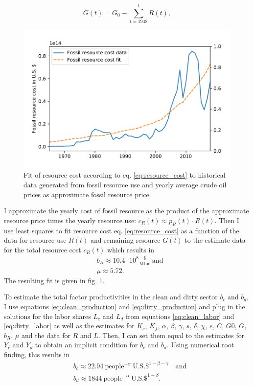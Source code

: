 \begin{equation} 
  G(t) = G_0 - \sum_{t=1948}^{t}R(t),
  \label{eq:fossil_resource_time_series}
\end{equation}
\begin{figure}
	\vspace{-.4 cm}
        \hspace{-1.25 cm}
        \includegraphics[width = .67 \textwidth]{./figures/resource_price_fit.pdf}
        \caption{Fit of resource cost according to eq. \ref{eq:resource_cost} to historical data generated from fossil resource use and yearly average crude oil prices as approximate fossil resource price. \label{fig:resource_cost_fit}}
\end{figure}


I approximate the yearly cost of fossil resource as the product of the approximate resource price times the yearly resource use: $c_R(t) \approx p_R(t) \cdot R(t)$. Then I use least squares to fit resource cost eq. \ref{eq:resource_cost} as a function of the data for resource use $R(t)$ and remaining resource $G(t)$ to the estimate data for the total resource cost $c_R(t)$ which results in 
\begin{align}
  &b_R \approx 10.4 \cdot 10^{8} \frac{\$}{\mathrm{Mtoe}} ~ \mathrm{and}\\
  & \mu \approx 5.72.
  \label{eq:estimate_resource_cost}
\end{align}
The resulting fit is given in fig. \ref{fig:resource_cost_fit}.

To estimate the total factor productivities in the clean and dirty sector $b_c$ and $b_d$, I use equations \ref{eq:clean_production} and \ref{eq:dirty_production} and plug in the solutions for the labor shares $L_c$ and $L_d$ from equations \ref{eq:clean_labor} and \ref{eq:dirty_labor} as well as the estimates for $K_c$, $K_f$, $\alpha$, $\beta$, $\gamma$, $s$, $\delta$, $\chi$, $e$, $C$, $G0$, $G$, $b_R$, $\mu$ and the data for $R$ and $L$. Then, I can set them equal to the estimates for $Y_c$ and $Y_d$ to obtain an implicit condition for $b_c$ and $b_d$. Using numerical root finding, this results in 
 \begin{align}
  &b_c \approx 22.94 ~ \mathrm{people} ^{-\alpha} ~ \mathrm{U.S. \$}^{1-\beta-\gamma} \quad \mathrm{and} \\
  &b_d \approx 1844 ~ \mathrm{people}^{-\alpha} ~ \mathrm{U.S. \$}^{1-\beta}.
  \label{eq:estimate_total_factor_productivities}
\end{align}

